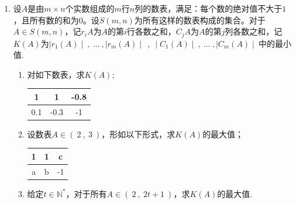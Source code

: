 \documentclass[11pt,a4paper]{ctexart}
\newcounter{chapPage}
\begin{document}
\begin{enumerate}[start=16]
    $a.$已知实数$a \neq 0$，设函数$f(x)=a \ln x+ \sqrt{x+1}\ ,\ x>0$.
    \begin{enumerate}[label=(\Roman*)]
        \item 当$a=-\dfrac{3}{4}$时，求$f(x)$的单调区间；
        \item 若$\forall \ x \in [\ \dfrac{1}{e^2}\ ,\ + \infty\ )$，均有$f(x) \le \dfrac{\sqrt{x}}{2a}$，求$a$的取值范围.
    \end{enumerate}
    $b.$已知函数$f(x)=e^x-e^{-x}-2x$. 
    \begin{enumerate}[label=(\Roman*)]
        \item 讨论$f(x)$的单调性；
        \item 设$g(x)=f(2x)-4bf(x)$，当$x>0$时，$g(x)>0$，求$b$的最大值；
        \item 已知$1.4142<\sqrt{2}<1.4143$，估计$\ln 2$的近似值（精确到$0.001$）.
    \end{enumerate}

    \vspace*{\fill}
    \item 设$A$是由$m \times n$个实数组成的$m$行$n$列的数表，满足：每个数的绝对值不大于$1$，且所有数的和为$0$。设$S(m,n)$为所有这样的数表构成的集合。对于$A \in S(m,n)$，记$r_iA$为$A$的第$i$行各数之和，$C_jA$为$A$的第$j$列各数之和，记$K(A)$为$\mid r_1(A) \mid
    \ ,\ \ldots \ ,\mid r_m(A) \mid\ \ ,\ \mid C_1(A) \mid \ ,\ \ldots \ ,\mid C_m(A) \mid\
    $中的最小值.
    \begin{enumerate}[label=(\Roman*)]
        \item 对如下数表，求$K(A)$;
        
        \begin{tabular}{|c|c|c|}%
            \hline
            1 & 1 & -0.8 \\
            \hline
            0.1 & -0.3 & -1 \\
            \hline
        \end{tabular}
        
        \item 设数表$A \in (\ 2\ ,\ 3\ )$，形如以下形式，求$K(A)$的最大值；
        
        \begin{tabular}{|c|c|c|}%
            \hline
            1 & 1 & c \\
            \hline
            a & b & -1 \\
            \hline
        \end{tabular}
        
        \item 给定$t \in \mathbb{N^*}$，对于所有$A \in(\ 2\ ,\ 2t+1\ )$，求$K(A)$的最大值.
    \end{enumerate}
    \vspace*{\fill}
    
\end{enumerate}
\clearpage %
\setcounter{enumi}{0}   %
{} %
\setcounter{chapPage}{1} %
\end{document}
